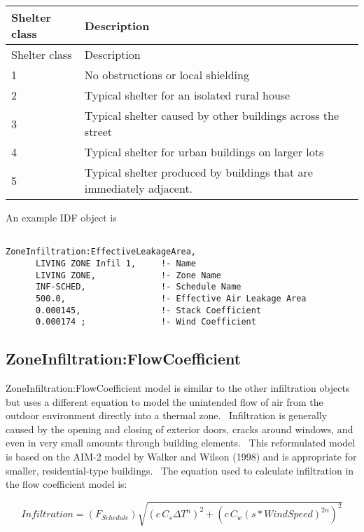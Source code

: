 \begin{longtable}[c]{p{1.5in}p{4.5in}}
\toprule 
Shelter class & Description \tabularnewline
\midrule
\endfirsthead

\toprule 
Shelter class & Description \tabularnewline
\midrule
\endhead

1 & No obstructions or local shielding \tabularnewline
2 & Typical shelter for an isolated rural house \tabularnewline
3 & Typical shelter caused by other buildings across the street \tabularnewline
4 & Typical shelter for urban buildings on larger lots \tabularnewline
5 & Typical shelter produced by buildings that are immediately adjacent. \tabularnewline
\bottomrule
\end{longtable}

An example IDF object is

\begin{lstlisting}

ZoneInfiltration:EffectiveLeakageArea,
      LIVING ZONE Infil 1,     !- Name
      LIVING ZONE,             !- Zone Name
      INF-SCHED,               !- Schedule Name
      500.0,                   !- Effective Air Leakage Area
      0.000145,                !- Stack Coefficient
      0.000174 ;               !- Wind Coefficient
\end{lstlisting}

\subsection{ZoneInfiltration:FlowCoefficient}\label{zoneinfiltrationflowcoefficient}

ZoneInfiltration:FlowCoefficient model is similar to the other infiltration objects but uses a different equation to model the unintended flow of air from the outdoor environment directly into a thermal zone.~ Infiltration is generally caused by the opening and closing of exterior doors, cracks around windows, and even in very small amounts through building elements.~ This reformulated model is based on the AIM-2 model by Walker and Wilson (1998) and is appropriate for smaller, residential-type buildings.~ The equation used to calculate infiltration in the flow coefficient model is:

\begin{equation}
Infiltration = \left( {{F_{Schedule}}} \right)\sqrt {{{\left( {c\,{C_s}\Delta {T^n}} \right)}^2} + {{\left( {c\,{C_w}{{\left( {s * WindSpeed} \right)}^{2n}}} \right)}^2}}
\end{equation}

